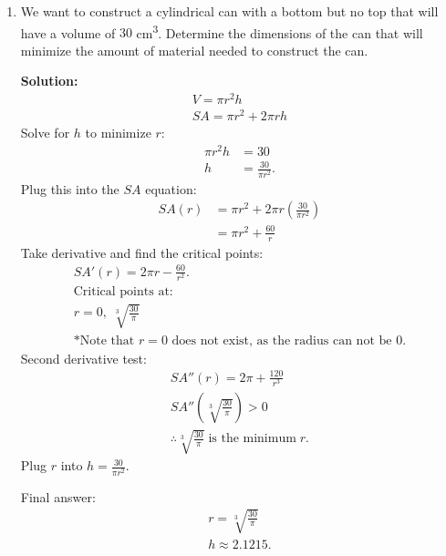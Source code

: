 \documentclass[12pt]{article}
\begin{document}
\begin{enumerate}
                    \begin{center}
                        * * * * *
                    \end{center}

                \item We want to construct a cylindrical can with a bottom but no top that will have a volume of $30$ cm\textsuperscript{3}. Determine the dimensions of the can that will minimize the amount of material needed to construct the can.

                    \noindent \textbf{Solution:}
                    \begin{gather*}
                        V = \pi r^2 h \\
                        SA = \pi r^2 + 2\pi rh
                    \end{gather*}
                    Solve for $h$ to minimize $r$:
                    \begin{align*}
                        \pi r^2 h &= 30 \\
                        h &= \frac{30}{\pi r^2}.
                    \end{align*}
                    Plug this into the $SA$ equation:
                    \begin{align*}
                        SA(r) &= \pi r^2 + 2\pi r \left( \frac{30}{\pi r^2} \right) \\[6pt]
                        &= \pi r^2 + \frac{60}{r}
                    \end{align*}
                    Take derivative and find the critical points:
                    \begin{gather*}
                        SA'(r) = 2 \pi r - \frac{60}{r^2}. \\[6pt]
                        \text{Critical points at:} \\
                        r = 0, \; \sqrt[3]{\frac{30}{\pi}} \\[6pt]
                        \text{*Note that $r=0$ does not exist, as the radius can not be $0$.}
                    \end{gather*}
                    Second derivative test:
                    \begin{gather*}
                        SA''(r) = 2 \pi + \frac{120}{r^3} \\[6pt]
                        SA'' \left( \sqrt[3]{\frac{30}{\pi}} \right) > 0 \\[6pt]
                        \therefore \sqrt[3]{\frac{30}{\pi}} \; \text{is the minimum} \; r.
                    \end{gather*}
                    Plug $r$ into $h=\frac{30}{\pi r^2}$.

                    \noindent Final answer:
                    \begin{gather*}
                        r = \sqrt[3]{\frac{30}{\pi}} \\[6pt]
                        h \approx 2.1215.
                    \end{gather*}
            \end{enumerate}
\end{document}
